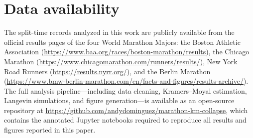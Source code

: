 
\section*{Data availability}

The split-time records analyzed in this work are publicly
available from the official results pages of the four World
Marathon Majors: the Boston Athletic Association
(\url{https://www.baa.org/races/boston-marathon/results}),
the Chicago Marathon
(\url{https://www.chicagomarathon.com/runners/results/}),
New York Road Runners
(\url{https://results.nyrr.org/}), and the Berlin Marathon
(\url{https://www.bmw-berlin-marathon.com/en/facts-and-figures/results-archive/}).
The full analysis pipeline---including data cleaning,
Kramers--Moyal estimation, Langevin simulations, and
figure generation---is available as an open-source repository
at \url{https://github.com/andydominguez/marathon-km-collapse},
which contains the annotated Jupyter notebooks required to
reproduce all results and figures reported in this paper.
